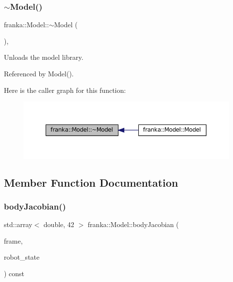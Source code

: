 \subsubsection{\texorpdfstring{$\sim$\+Model()}{~Model()}}
{\footnotesize\ttfamily franka\+::\+Model\+::$\sim$\+Model (\begin{DoxyParamCaption}{ }\end{DoxyParamCaption})\hspace{0.3cm}{\ttfamily [default]}, {\ttfamily [noexcept]}}

Unloads the model library. 

Referenced by Model().

Here is the caller graph for this function\+:
\nopagebreak
\begin{figure}[H]
\begin{center}
\leavevmode
\includegraphics[width=350pt]{classfranka_1_1Model_a1d6ffa26afc6cfdff7e329d15b8bd65e_icgraph}
\end{center}
\end{figure}


\subsection{Member Function Documentation}
\mbox{\label{classfranka_1_1Model_af5525104e79cd6b8b05adbf83dc328c1}} 
\subsubsection{\texorpdfstring{body\+Jacobian()}{bodyJacobian()}\hspace{0.1cm}{\footnotesize\ttfamily [1/2]}}
{\footnotesize\ttfamily std\+::array$<$ double, 42 $>$ franka\+::\+Model\+::body\+Jacobian (\begin{DoxyParamCaption}\item[{\hyperlink{namespacefranka_a00b729ddce916481d3f0d10febec4f5b}{Frame}}]{frame,  }\item[{const \hyperlink{structfranka_1_1RobotState}{franka\+::\+Robot\+State} \&}]{robot\+\_\+state }\end{DoxyParamCaption}) const}

